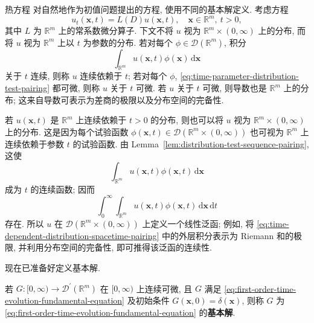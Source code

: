 \begin{Example}{热方程}
\label{ex:heat-fundamental-solution}
对自然地作为初值问题提出的方程, 使用不同的基本解定义. 考虑方程
\begin{equation}\label{eq:first-order-time-evolution-fundamental-equation}
u_t(\bm{x},t)=L(D)u(\bm{x},t),\quad\bm{x}\in\mathbb{R}^m,\ t>0,
\end{equation}
其中 $L$ 为 $\mathbb{R}^m$ 上的常系数微分算子. 下文不将 $u$ 视为 $\mathbb{R}^m\times(0,\infty)$ 上的分布, 而将 $u$ 视为 $\mathbb{R}^m$ 上以 $t$ 为参数的分布. 若对每个 $\phi\in\mathcal{D}(\mathbb{R}^m)$, 积分
\begin{equation}\label{eq:time-parameter-distribution-test-pairing}
\int_{\mathbb{R}^m}u(\bm{x},t)\phi(\bm{x})\,\mathrm{d}\bm{x}
\end{equation}
关于 $t$ 连续, 则称 $u$ 连续依赖于 $t$; 若对每个 $\phi$, \eqref{eq:time-parameter-distribution-test-pairing} 都可微, 则称 $u$ 关于 $t$ 可微. 若 $u$ 关于 $t$ 可微, 则导数也是 $\mathbb{R}^m$ 上的分布; 这来自导数可表示为差商的极限以及分布空间的完备性.
\end{Example}

若 $u(\bm{x},t)$ 是 $\mathbb{R}^m$ 上连续依赖于 $t>0$ 的分布, 则也可以将 $u$ 视为 $\mathbb{R}^m\times(0,\infty)$ 上的分布. 这是因为每个试验函数 $\phi(\bm{x},t)\in\mathcal{D}(\mathbb{R}^m\times(0,\infty))$ 也可视为 $\mathbb{R}^m$ 上连续依赖于参数 $t$ 的试验函数. 由 Lemma~\ref{lem:distribution-test-sequence-pairing}, 这使
\begin{equation}\label{eq:time-dependent-test-distribution-pairing}
\int_{\mathbb{R}^m}u(\bm{x},t)\phi(\bm{x},t)\,\mathrm{d}\bm{x}
\end{equation}
成为 $t$ 的连续函数; 因而
\begin{equation}\label{eq:time-dependent-distribution-spacetime-pairing}
\int_0^\infty\int_{\mathbb{R}^m}u(\bm{x},t)\phi(\bm{x},t)\,\mathrm{d}\bm{x}\,\mathrm{d}t
\end{equation}
存在. 所以 $u$ 在 $\mathcal{D}(\mathbb{R}^m\times(0,\infty))$ 上定义一个线性泛函; 例如, 将 \eqref{eq:time-dependent-distribution-spacetime-pairing} 中的外层积分表示为 Riemann 和的极限, 并利用分布空间的完备性, 即可推得该泛函的连续性.

现在已准备好定义基本解.

\begin{Definition}
\label{def:evolution-fundamental-solution}
若 $G:[0,\infty)\to\mathcal{D}^{\prime}(\mathbb{R}^m)$ 在 $[0,\infty)$ 上连续可微, 且 $G$ 满足 \eqref{eq:first-order-time-evolution-fundamental-equation} 及初始条件 $G(\bm{x},0)=\delta(\bm{x})$, 则称 $G$ 为 \eqref{eq:first-order-time-evolution-fundamental-equation} 的\textbf{基本解}.
\end{Definition}

